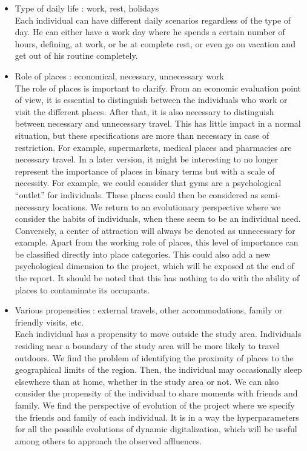 \begin{itemize}
\item Type of daily life : work, rest, holidays\\
Each individual can have different daily scenarios regardless of the type of day. He can either have a work day where he spends a certain number of hours, defining, at work, or be at complete rest, or even go on vacation and get out of his routine completely.\\

\item Role of places : economical, necessary, unnecessary work\\
The role of places is important to clarify. From an economic evaluation point of view, it is essential to distinguish between the individuals who work or visit the different places. After that, it is also necessary to distinguish between necessary and unnecessary travel. This has little impact in a normal situation, but these specifications are more than necessary in case of restriction. For example, supermarkets, medical places and pharmacies are necessary travel. In a later version, it might be interesting to no longer represent the importance of places in binary terms but with a scale of necessity. For example, we could consider that gyms are a psychological ``outlet'' for individuals. These places could then be considered as semi-necessary locations. We return to an evolutionary perspective where we consider the habits of individuals, when these seem to be an individual need. Conversely, a center of attraction will always be denoted as unnecessary for example. Apart from the working role of places, this level of importance can be classified directly into place categories. This could also add a new psychological dimension to the project, which will be exposed at the end of the report. It should be noted that this has nothing to do with the ability of places to contaminate its occupants.\\

\item Various propensities : external travels, other accommodations, family or friendly visits, etc.\\
Each individual has a propensity to move outside the study area. Individuals residing near a boundary of the study area will be more likely to travel outdoors. We find the problem of identifying the proximity of places to the geographical limits of the region. Then, the individual may occasionally sleep elsewhere than at home, whether in the study area or not. We can also consider the propensity of the individual to share moments with friends and family. We find the perspective of evolution of the project where we specify the friends and family of each individual. It is in a way the hyperparameters for all the possible evolutions of dynamic digitalization, which will be useful among others to approach the observed affluences.\\


\end{itemize}
